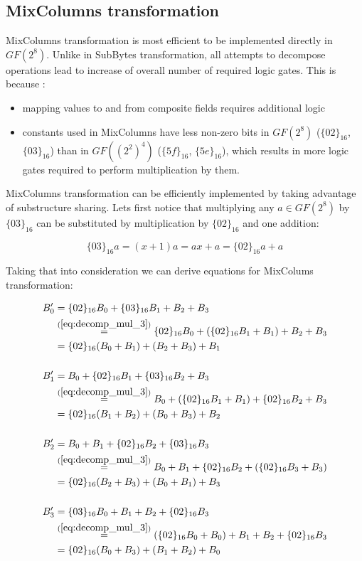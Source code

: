 \subsection{MixColumns transformation}

MixColumns transformation is most efficient to be implemented directly in $GF(2^8)$. Unlike in SubBytes transformation, all attempts to decompose operations lead to increase of overall number of required logic gates. This is because \cite{vlsi}:

\begin{itemize}[nolistsep]
\item mapping values to and from composite fields requires additional logic
\item constants used in MixColumns have less non-zero bits in $GF(2^8)$ ($\{02\}_{16}$, $\{03\}_{16}$) than in $GF((2^2)^4)$ ($\{5f\}_{16}$, $\{5e\}_{16}$), which results in more logic gates required to perform multiplication by them.
\end{itemize}

MixColumns transformation can be efficiently implemented by taking advantage of substructure sharing. Lets first notice that multiplying any $a \in GF(2^8)$ by $\{03\}_{16}$ can be substituted by multiplication by $\{02\}_{16}$ and one addition:

\begin{equation}
\label{eq:decomp_mul_3}
\{03\}_{16}a = (x + 1)a = ax + a = \{02\}_{16}a + a
\end{equation}

Taking that into consideration we can derive equations for MixColums transformation:

\begin{equation}
\label{xd}
\begin{aligned}
B_0' &= \{02\}_{16}B_0 + \{03\}_{16}B_1 + B_2 + B_3 \\
&\stackrel{(\ref{eq:decomp_mul_3})}{=}
\{02\}_{16}B_0 + (\{02\}_{16}B_1 + B_1) + B_2 + B_3 \\
&= \{02\}_{16}(B_0 + B_1) + (B_2 + B_3) + B_1 \\ \\
%
B_1' &= B_0 + \{02\}_{16}B_1 + \{03\}_{16}B_2 +  B_3 \\ 
&\stackrel{(\ref{eq:decomp_mul_3})}{=}
B_0 + (\{02\}_{16}B_1 + B_1) + \{02\}_{16}B_2 + B_3 \\ 
&= \{02\}_{16}(B_1 + B_2) + (B_0 + B_3) + B_2\\ \\
%
B_2' &= B_0 + B_1 + \{02\}_{16}B_2 + \{03\}_{16}B_3 \\
&\stackrel{(\ref{eq:decomp_mul_3})}{=}
B_0 + B_1 + \{02\}_{16}B_2 + (\{02\}_{16}B_3 + B_3) \\
&= \{02\}_{16}(B_2 + B_3) + (B_0 + B_1) + B_3 \\ \\
%
B_3' &= \{03\}_{16}B_0 + B_1 + B_2 + \{02\}_{16}B_3 \\
&\stackrel{(\ref{eq:decomp_mul_3})}{=}
(\{02\}_{16}B_0 + B_0) + B_1 + B_2 + \{02\}_{16}B_3 \\
&= \{02\}_{16}(B_0 + B_3) + (B_1 + B_2) + B_0
\end{aligned}
\end{equation}

